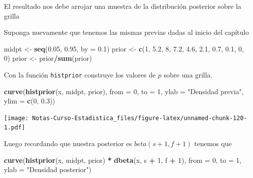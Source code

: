 \documentclass[
  12pt,
]{book}
\newenvironment{Shaded}{\begin{snugshade}}{\end{snugshade}}
\newcommand{\DataTypeTok}[1]{\textcolor[rgb]{0.13,0.29,0.53}{#1}}
\newcommand{\DecValTok}[1]{\textcolor[rgb]{0.00,0.00,0.81}{#1}}
\newcommand{\FloatTok}[1]{\textcolor[rgb]{0.00,0.00,0.81}{#1}}
\newcommand{\KeywordTok}[1]{\textcolor[rgb]{0.13,0.29,0.53}{\textbf{#1}}}
\newcommand{\NormalTok}[1]{#1}
\newcommand{\OperatorTok}[1]{\textcolor[rgb]{0.81,0.36,0.00}{\textbf{#1}}}
\newcommand{\StringTok}[1]{\textcolor[rgb]{0.31,0.60,0.02}{#1}}
\theoremstyle{definition}
\theoremstyle{definition}
\theoremstyle{definition}
\theoremstyle{remark}
\begin{document}
El resultado nos debe arrojar una muestra de la distribución posterior
sobre la grilla

Suponga nuevamente que tenemos las mismas previas dadas al inicio del
capítulo

\begin{Shaded}
\begin{Highlighting}[]
\NormalTok{midpt <-}\StringTok{ }\KeywordTok{seq}\NormalTok{(}\FloatTok{0.05}\NormalTok{, }\FloatTok{0.95}\NormalTok{, }\DataTypeTok{by =} \FloatTok{0.1}\NormalTok{)}
\NormalTok{prior <-}\StringTok{ }\KeywordTok{c}\NormalTok{(}\DecValTok{1}\NormalTok{, }\FloatTok{5.2}\NormalTok{, }\DecValTok{8}\NormalTok{, }\FloatTok{7.2}\NormalTok{, }\FloatTok{4.6}\NormalTok{, }\FloatTok{2.1}\NormalTok{, }\FloatTok{0.7}\NormalTok{, }\FloatTok{0.1}\NormalTok{, }\DecValTok{0}\NormalTok{, }\DecValTok{0}\NormalTok{)}
\NormalTok{prior <-}\StringTok{ }\NormalTok{prior}\OperatorTok{/}\KeywordTok{sum}\NormalTok{(prior)}
\end{Highlighting}
\end{Shaded}

Con la función \texttt{histprior} construye los valores de \(p\) sobre una
grilla.

\begin{Shaded}
\begin{Highlighting}[]
\KeywordTok{curve}\NormalTok{(}\KeywordTok{histprior}\NormalTok{(x, midpt, prior), }\DataTypeTok{from =} \DecValTok{0}\NormalTok{, }\DataTypeTok{to =} \DecValTok{1}\NormalTok{, }
    \DataTypeTok{ylab =} \StringTok{"Densidad previa"}\NormalTok{, }\DataTypeTok{ylim =} \KeywordTok{c}\NormalTok{(}\DecValTok{0}\NormalTok{, }\FloatTok{0.3}\NormalTok{))}
\end{Highlighting}
\end{Shaded}

\texttt{[image: Notas-Curso-Estadistica\_files/figure-latex/unnamed-chunk-120-1.pdf]}

Luego recordando que nuestra posterior es \(beta(s+1,f+1)\) tenemos que

\begin{Shaded}
\begin{Highlighting}[]
\KeywordTok{curve}\NormalTok{(}\KeywordTok{histprior}\NormalTok{(x, midpt, prior) }\OperatorTok{*}\StringTok{ }\KeywordTok{dbeta}\NormalTok{(x, s }\OperatorTok{+}\StringTok{ }\DecValTok{1}\NormalTok{, }
\NormalTok{    f }\OperatorTok{+}\StringTok{ }\DecValTok{1}\NormalTok{), }\DataTypeTok{from =} \DecValTok{0}\NormalTok{, }\DataTypeTok{to =} \DecValTok{1}\NormalTok{, }\DataTypeTok{ylab =} \StringTok{"Densidad posterior"}\NormalTok{)}
\end{Highlighting}
\end{Shaded}
\end{document}
